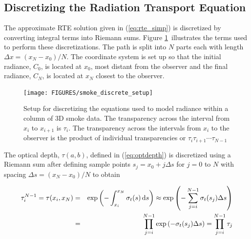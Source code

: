 \subsection{Discretizing the Radiation Transport Equation}
\newcommand{\htau}[1]{\tau_{#1}^{N-1}}
\newcommand{\halpha}[1]{\alpha_{#1}^{N-1}}
\newcommand{\sigai}[1]{\sigma_{a,#1}}
\newcommand{\Lei}[1]{C_{e,#1}}
\newcommand{\Lhatj}[1]{C_{#1}^N}
\newcommand{\Lhatjj}[1]{\hat{C}_{#1}^N}
\newcommand{\Chatjj}[1]{\hat{C}_{#1}^N}
\newcommand{\Leii}[1]{\hat{C}_{e,#1}}

The approximate RTE solution given in (\ref{eq:rte_simp}) is
discretized by converting integral terms into Riemann sums. Figure
\ref{fig:smokediscretesetup}\ illustrates the terms used to
perform these discretizations.  The path is split into $N$ parts
each with length $\Delta x=(x_N-x_0)/N$.  The coordinate system is
set up so that the initial radiance, $C_0$, is located at $x_0$,
most distant from the observer and the final radiance, $C_N$, is
located at $x_N$ closest to the observer.

\begin{figure}[\figoptions]
\begin{center}
\texttt{[image: FIGURES/smoke\_discrete\_setup]}
\end{center}
\caption[Setup for discretizing the equations used to model
radiance within a column of 3D smoke data.]{Setup for discretizing the equations used to model
radiance within a column of 3D smoke data. The transparency across the interval from $x_i$ to $x_{i+1}$ is $\tau_i$.
The transparency across the intervals from $x_i$ to the observer is the product of individual transparencies or $\tau_i\tau_{i+1}\cdots\tau_{N-1}$}
\label{fig:smokediscretesetup}
\end{figure}

The optical depth, $\tau(a,b)$, defined in (\ref{eq:optdepth}) is discretized using a Riemann sum  after defining sample points $s_j=x_0+j\Delta s$ for $j=0$ to $N$ with spacing $\Delta s=(x_N-x_0)/N$ to obtain

\begin{eqnarray}
\htau{i}=\tau(x_i,x_N)&=&\exp\left(-\int_{x_i}^{x_N}\sigma_t(s)\dx{s}\right)\approx\exp\left(-\sum_{j=i}^{N-1}\sigma_t(s_j)\Delta s\right)\\
&=&\prod_{j=i}^{N-1}\exp\left(-\sigma_t(s_j)\Delta s\right)=\prod_{j=i}^{N-1}\tau_j
\end{eqnarray}

